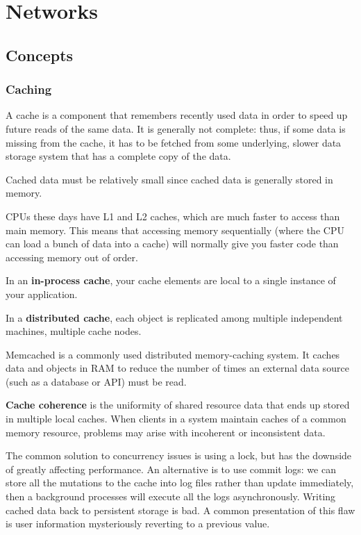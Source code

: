 \documentclass{article}
\begin{document}
\newpage
\section{Networks}
    \subsection{Concepts}
    
    \subsubsection{Caching}
    A cache is a component that remembers recently used data in order to speed up future reads of the same data. It is generally not complete: thus, if some data is missing from the cache, it has to be fetched from some underlying, slower data storage system that has a complete copy of the data.
    
    Cached data must be relatively small since cached data is generally stored in memory.
    
    CPUs these days have L1 and L2 caches, which are much faster to access than main memory. This means that accessing memory sequentially (where the CPU can load a bunch of data into a cache) will normally give you faster code than accessing memory out of order.
    
    In an \textbf{in-process cache}, your cache elements are local to a single instance of your application. 
    
    In a \textbf{distributed cache}, each object is replicated among multiple independent machines, multiple cache nodes.
    
    Memcached is a commonly used distributed memory-caching system. It caches data and objects in RAM to reduce the number of times an external data source (such as a database or API) must be read.
    
    \textbf{Cache coherence} is the uniformity of shared resource data that ends up stored in multiple local caches. When clients in a system maintain caches of a common memory resource, problems may arise with incoherent or inconsistent data.
    
    The common solution to concurrency issues is using a lock, but has the downside of greatly affecting performance. An alternative is to use commit logs: we can store all the mutations to the cache into log files rather than update immediately, then a background processes will execute all the logs asynchronously. Writing cached data back to persistent storage is bad. A common presentation of this flaw is user information mysteriously reverting to a previous value. 
    
\end{document}
